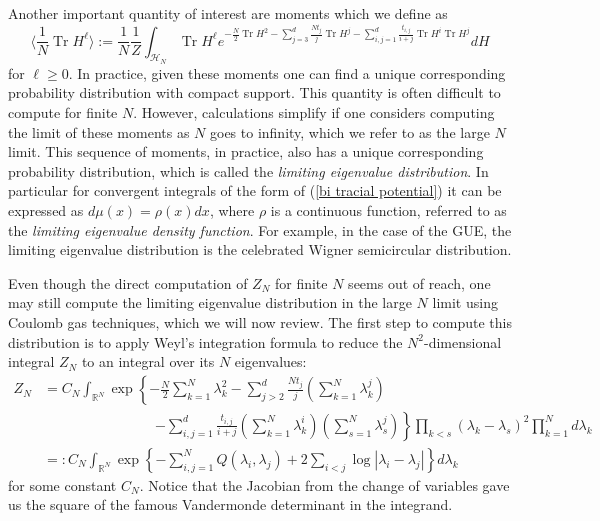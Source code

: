 \documentclass[10pt]{article}
\DeclareMathOperator{\tr}{Tr}
\begin{document}
\begin{appendices}
	Another important quantity of interest are moments which we define as 
	\begin{equation*}
		\langle \frac{1}{N}\tr H^{\ell}\rangle   :=\frac{1}{N}\frac{1}{Z}\int_{\mathcal{H}_{N}} \tr H^{\ell} e^{-\frac{N}{2}\tr H^{2} -  \sum_{j=3}^{d} \frac{N t_{j}}{j}\tr H^{j}-\sum_{i,j=1}^{d} \frac{ t_{i,j}}{i+j}\tr H^{i}\tr H^{j}}dH
	\end{equation*}
for $\ell \geq 0$. In practice, given these moments one can find a unique  corresponding probability distribution with compact support. This quantity is often difficult to compute for finite $N$. However, calculations simplify if one considers computing the limit of these moments as $N$ goes to infinity, which we refer to as the large $N$ limit. This sequence of moments, in practice, also has a unique corresponding probability distribution, which is called the \textit{limiting eigenvalue distribution}.  In particular for convergent integrals of the form of (\ref{bi tracial potential}) it can be expressed as $d\mu(x) = \rho(x)dx$, where $\rho$ is a continuous function, referred to as the \textit{limiting eigenvalue density function}. For example, in the case of the GUE, the limiting eigenvalue distribution is the celebrated Wigner semicircular distribution.

Even though the direct computation of $Z_{N}$ for finite $N$ seems out of reach, one may still compute the limiting eigenvalue distribution in the large $N$ limit using Coulomb gas techniques, which we will now review. The first step to compute this distribution is to apply Weyl's integration formula \cite{Guionnet} to reduce the $N^{2}$-dimensional integral $Z_{N}$  to an integral over its $N$ eigenvalues: 
	\begin{align*}
		Z_{N}&=C_{N}\int_{\mathbb{R}^{N}} \exp\left\{-\frac{N}{2}\sum_{k=1}^{N} \lambda_{k}^{2} -  \sum_{j>2}^{d} \frac{N t_{j}}{j}\left(\sum_{k=1}^{N} \lambda_{k}^{j}\right)
		\right.\\
		&\qquad \qquad \qquad \qquad \left. -\sum_{i,j=1}^{d} \frac{ t_{i,j}}{i+j}\left(\sum_{k=1}^{N} \lambda_{k}^{i}\right)\left(\sum_{s=1}^{N} \lambda_{s}^{j}\right)\right\}\prod_{k<s}(\lambda_{k}-\lambda_{s})^{2} \prod_{k=1}^{N}d\lambda_{k}\\
		&=:C_{N}\int_{\mathbb{R}^{N}} \exp\left\{-\sum_{i,j=1}^{N} Q(\lambda_{i},\lambda_{j})+ 2 \sum_{i<j} \log |\lambda_{i}-\lambda_{j}|\right\} d\lambda_{k}
	\end{align*}
	for some constant $C_{N} $. Notice that the Jacobian from the change of variables gave us the square of the famous Vandermonde determinant in the integrand. 
	

\end{appendices}
\end{document}
